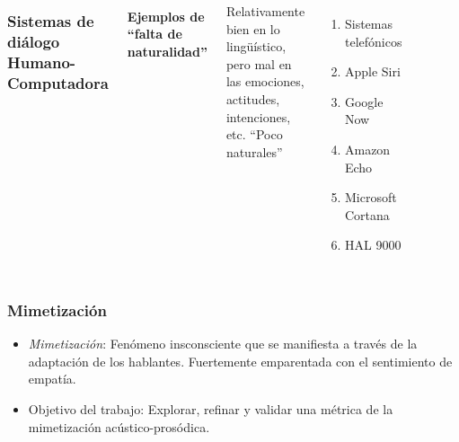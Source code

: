 \begin{frame}
  \begin{columns}
    \frametitle{Sistemas de diálogo Humano-Computadora}
    \framesubtitle{Ejemplos de ``falta de naturalidad''}

    Relativamente bien en lo lingüístico, pero mal en las emociones, actitudes, intenciones, etc. ``Poco naturales''

    \begin{enumerate}
      \item Sistemas telefónicos
      \item Apple Siri
      \item Google Now
      \item Amazon Echo
      \item Microsoft Cortana
      \item HAL 9000
    \end{enumerate}
    \begin{figure}
      \includegraphics[scale=0.35]{images/hal.jpg}
    \end{figure}
  \end{columns}
\end{frame}

\begin{frame}
  \frametitle{Mimetización}
  \begin{itemize}
    \item \emph{Mimetización}: Fenómeno insconsciente que se manifiesta a través de la adaptación de los hablantes. Fuertemente emparentada con el sentimiento de empatía.
    \item Objetivo del trabajo: Explorar, refinar y validar una métrica de la mimetización acústico-prosódica.
  \end{itemize}

\end{frame}

